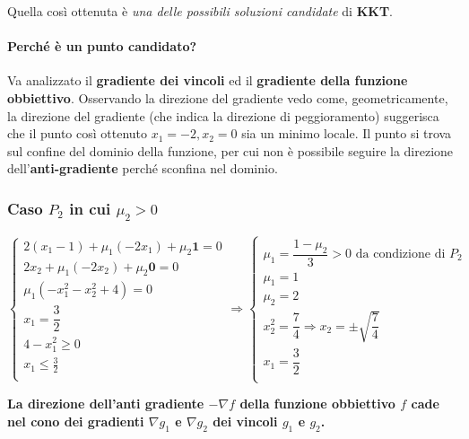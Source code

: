 \documentclass[\main/main.tex]{subfiles}
\begin{document}
Quella così ottenuta è \textit{una delle possibili soluzioni candidate} di \textbf{KKT}.

\paragraph{Perché è un punto candidato?} Va analizzato il \textbf{gradiente dei vincoli} ed il \textbf{gradiente della funzione obbiettivo}. Osservando la direzione del gradiente vedo come, geometricamente, la direzione del gradiente (che indica la direzione di peggioramento) suggerisca che il punto così ottenuto $x_1 = -2, x_2 = 0$ sia un minimo locale. Il punto si trova sul confine del dominio della funzione, per cui non è possibile seguire la direzione dell'\textbf{anti-gradiente} perché sconfina nel dominio.

\subsubsection{Caso $P_2$ in cui $\mu_2 > 0$}
\[
	\begin{cases}
		2(x_1-1) + \mu_1 (-2x_1) + \mu_2 \bm{1} = 0 \\
		2x_2 + \mu_1 (-2x_2) + \mu_2  \bm{0} = 0    \\
		\mu_1 (-x_1^2 - x_2^2 + 4)= 0               \\
		x_1= \dfrac{3}{2}                           \\
		4-x_1^2 \geq 0                              \\
		x_1 \leq \frac{3}{2}                        \\
	\end{cases}
	\Rightarrow
	\begin{cases}
		\mu_1 = \dfrac{1-\mu_2}{3} > 0 \text{ da condizione di $P_2$}   \\
		\mu_1 = 1                                                       \\
		\mu_2 = 2                                                       \\
		x_2^2 = \dfrac{7}{4} \Rightarrow x_2 = \pm \sqrt{ \dfrac{7}{4}} \\
		x_1= \dfrac{3}{2}                                               \\
	\end{cases}
\]

\textbf{La direzione dell'anti gradiente $-\nabla f$ della funzione obbiettivo $f$ cade nel cono dei gradienti  $\nabla g_1$ e $\nabla g_2$ dei vincoli $g_1$ e $g_2$.}
\end{document}
